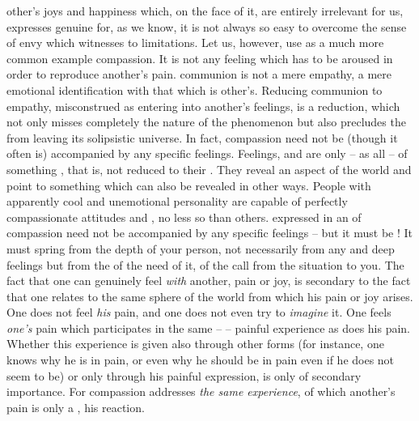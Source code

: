  other's joys and happiness which, on the face of it, are entirely
irrelevant for us, expresses genuine  for, as we know, it is not
always so easy to overcome the sense of envy which witnesses to 
limitations.  Let us, however, use as a much more common example compassion. It
is not any feeling which has to be aroused in order to reproduce another's pain.
 communion is not a mere empathy, a mere emotional identification
with that which is other's.  Reducing  communion to empathy,
misconstrued as entering into another's feelings, is a 
reduction, which not only misses completely the nature of the phenomenon but
also precludes the  from leaving its solipsistic universe. In fact,
compassion need not be (though it often is) accompanied by any specific
feelings. Feelings,  and  are only  -- as
all  -- of something , that is, not reduced to their
. They reveal an aspect of the world and point to
something which can also be revealed in other ways. People with apparently cool
and unemotional personality are capable of perfectly compassionate attitudes and
, no less so than others.   expressed in an  of
compassion need not be accompanied by any specific feelings -- but it must be
! It must spring from the depth of your person, not necessarily
from any  and deep feelings but from the  of the need
of it, of the call from the  situation to you.  The fact that one can
genuinely feel {\em with} another, pain or joy, is secondary to the fact that
one relates to the same sphere of the world from which his pain or joy arises.
One does not feel {\em his} pain, and one does not even try to {\em imagine} it.
One feels {\em one's} pain which participates in the same --  --
painful experience as does his pain. Whether this experience is given also
through other forms (for instance, one knows why he is in pain, or even why he
should be in pain even if he does not seem to be) or only through his painful
expression, is only of secondary importance. For compassion addresses {\em the
  same experience}, of which another's pain is only a , his reaction.

